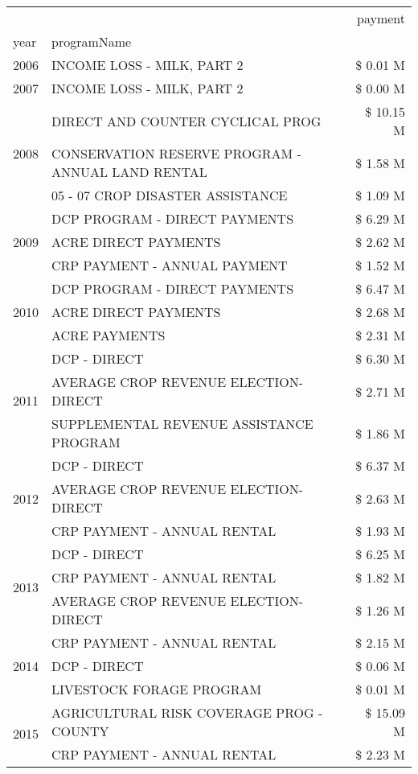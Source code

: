 \begin{tabular}{llr}
\toprule
 &  & payment \\
year & programName &  \\
\midrule
2006 & INCOME LOSS - MILK, PART 2 & \$ 0.01 M \\
\cline{1-3}
2007 & INCOME LOSS - MILK, PART 2 & \$ 0.00 M \\
\cline{1-3}
\multirow[t]{3}{*}{2008} & DIRECT AND COUNTER CYCLICAL PROG & \$ 10.15 M \\
 & CONSERVATION RESERVE PROGRAM - ANNUAL LAND RENTAL & \$ 1.58 M \\
 & 05 - 07 CROP DISASTER ASSISTANCE & \$ 1.09 M \\
\cline{1-3}
\multirow[t]{3}{*}{2009} & DCP PROGRAM - DIRECT PAYMENTS & \$ 6.29 M \\
 & ACRE DIRECT PAYMENTS & \$ 2.62 M \\
 & CRP PAYMENT - ANNUAL PAYMENT & \$ 1.52 M \\
\cline{1-3}
\multirow[t]{3}{*}{2010} & DCP PROGRAM - DIRECT PAYMENTS & \$ 6.47 M \\
 & ACRE DIRECT PAYMENTS & \$ 2.68 M \\
 & ACRE PAYMENTS & \$ 2.31 M \\
\cline{1-3}
\multirow[t]{3}{*}{2011} & DCP - DIRECT & \$ 6.30 M \\
 & AVERAGE CROP REVENUE ELECTION-DIRECT & \$ 2.71 M \\
 & SUPPLEMENTAL REVENUE ASSISTANCE PROGRAM & \$ 1.86 M \\
\cline{1-3}
\multirow[t]{3}{*}{2012} & DCP - DIRECT & \$ 6.37 M \\
 & AVERAGE CROP REVENUE ELECTION-DIRECT & \$ 2.63 M \\
 & CRP PAYMENT - ANNUAL RENTAL & \$ 1.93 M \\
\cline{1-3}
\multirow[t]{3}{*}{2013} & DCP - DIRECT & \$ 6.25 M \\
 & CRP PAYMENT - ANNUAL RENTAL & \$ 1.82 M \\
 & AVERAGE CROP REVENUE ELECTION-DIRECT & \$ 1.26 M \\
\cline{1-3}
\multirow[t]{3}{*}{2014} & CRP PAYMENT - ANNUAL RENTAL & \$ 2.15 M \\
 & DCP - DIRECT & \$ 0.06 M \\
 & LIVESTOCK FORAGE PROGRAM & \$ 0.01 M \\
\cline{1-3}
\multirow[t]{3}{*}{2015} & AGRICULTURAL RISK COVERAGE PROG - COUNTY & \$ 15.09 M \\
 & CRP PAYMENT - ANNUAL RENTAL & \$ 2.23 M \\

\end{tabular}
